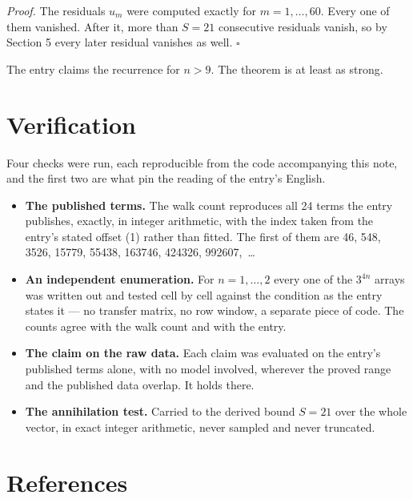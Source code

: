 \documentclass[11pt]{article}
\theoremstyle{definition}
\begin{document}
{\itshape Proof.} The residuals $u_m$ were computed exactly for $m = 1,\dots,60$. Every one of them vanished. After it, more than $S = 21$ consecutive residuals vanish, so by Section 5 every later residual vanishes as well. $\square$

The entry claims the recurrence for $n > 9$. The theorem is at least as strong.

\section{Verification}

Four checks were run, each reproducible from the code accompanying this note, and the first two are what pin the reading of the entry's English.

\begin{itemize}

\item {\bfseries The published terms.} The walk count reproduces all 24 terms the entry publishes, exactly, in integer arithmetic, with the index taken from the entry's stated offset (1) rather than fitted. The first of them are 46, 548, 3526, 15779, 55438, 163746, 424326, 992607,~\dots

\item {\bfseries An independent enumeration.} For $n = 1,\dots,2$ every one of the $3^{4n}$ arrays was written out and tested cell by cell against the condition as the entry states it --- no transfer matrix, no row window, a separate piece of code. The counts agree with the walk count and with the entry.

\item {\bfseries The claim on the raw data.} Each claim was evaluated on the entry's published terms alone, with no model involved, wherever the proved range and the published data overlap. It holds there.

\item {\bfseries The annihilation test.} Carried to the derived bound $S = 21$ over the whole vector, in exact integer arithmetic, never sampled and never truncated.

\end{itemize}

\section{References}
\end{document}
